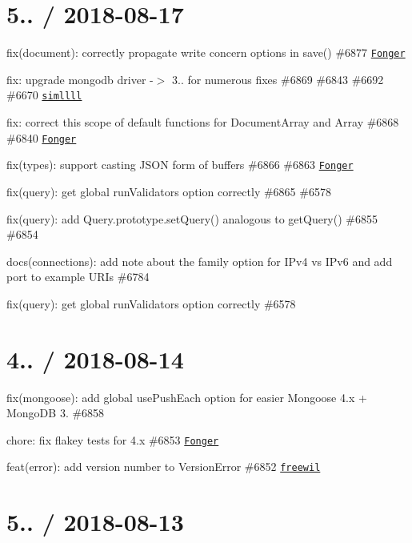 \section*{5.. / 2018-\/08-\/17 }


\begin{DoxyItemize}
\item fix(document)\+: correctly propagate write concern options in save() \#6877 \href{https://github.com/Fonger}{\tt Fonger}
\item fix\+: upgrade mongodb driver -\/$>$ 3.. for numerous fixes \#6869 \#6843 \#6692 \#6670 \href{https://github.com/simllll}{\tt simllll}
\item fix\+: correct {\ttfamily this} scope of default functions for Document\+Array and Array \#6868 \#6840 \href{https://github.com/Fonger}{\tt Fonger}
\item fix(types)\+: support casting J\+S\+ON form of buffers \#6866 \#6863 \href{https://github.com/Fonger}{\tt Fonger}
\item fix(query)\+: get global run\+Validators option correctly \#6865 \#6578
\item fix(query)\+: add Query.\+prototype.\+set\+Query() analogous to {\ttfamily get\+Query()} \#6855 \#6854
\item docs(connections)\+: add note about the {\ttfamily family} option for I\+Pv4 vs I\+Pv6 and add port to example U\+R\+Is \#6784
\item fix(query)\+: get global run\+Validators option correctly \#6578
\end{DoxyItemize}

\section*{4.. / 2018-\/08-\/14 }


\begin{DoxyItemize}
\item fix(mongoose)\+: add global {\ttfamily use\+Push\+Each} option for easier Mongoose 4.\+x + Mongo\+DB 3. \#6858
\item chore\+: fix flakey tests for 4.\+x \#6853 \href{https://github.com/Fonger}{\tt Fonger}
\item feat(error)\+: add version number to Version\+Error \#6852 \href{https://github.com/freewil}{\tt freewil}
\end{DoxyItemize}

\section*{5.. / 2018-\/08-\/13 }


